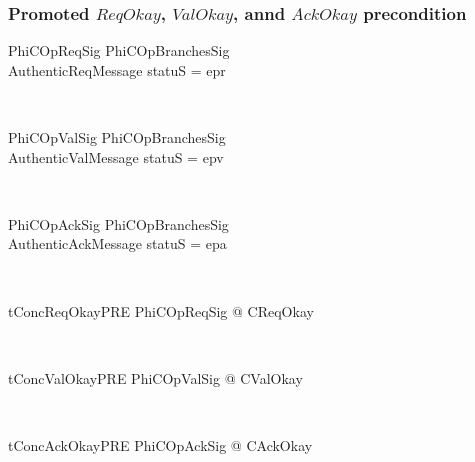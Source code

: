 \subsubsection{Promoted $ReqOkay$, $ValOkay$, annd $AckOkay$ precondition}

\begin{LNewSDef}
\begin{schema}{PhiCOpReqSig}
    PhiCOpBranchesSig \\
    AuthenticReqMessage
\where
    statuS = epr
\end{schema}~\end{LNewSDef}

\begin{LNewSDef}
\begin{schema}{PhiCOpValSig}
    PhiCOpBranchesSig \\
    AuthenticValMessage
\where
    statuS = epv
\end{schema}~\end{LNewSDef}

\begin{LNewSDef}
\begin{schema}{PhiCOpAckSig}
    PhiCOpBranchesSig \\
    AuthenticAckMessage
\where
    statuS = epa
\end{schema}~\end{LNewSDef}

\begin{LNewThm}
\begin{theorem}{tConcReqOkayPRE}
   \forall PhiCOpReqSig @ \pre CReqOkay
\end{theorem}~\end{LNewThm}

\begin{LNewThm}
\begin{theorem}{tConcValOkayPRE}
   \forall PhiCOpValSig @ \pre CValOkay
\end{theorem}~\end{LNewThm}

\begin{LNewThm}
\begin{theorem}{tConcAckOkayPRE}
   \forall PhiCOpAckSig @ \pre CAckOkay
\end{theorem}~\end{LNewThm}

